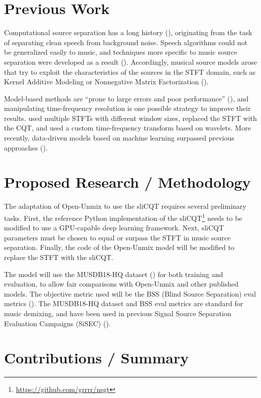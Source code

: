 \documentclass[letter,12pt]{article}
\begin{document}
\section{Previous Work}

Computational source separation has a long history (\cite{musicsepgood}), originating from the task of separating clean speech from background noise. Speech algorithms could not be generalized easily to music, and techniques more specific to music source separation were developed as a result (\cite{musicseptechniques1}). Accordingly, musical source models arose that try to exploit the characteristics of the sources in the STFT domain, such as Kernel Additive Modeling or Nonnegative Matrix Factorization (\cite{musicsepgood}).

Model-based methods are ``prone to large errors and poor performance'' (\cite[13]{musicsepintro1}), and manipulating time-frequency resolution is one possible strategy to improve their results. \textcite{driedger} used multiple STFTs with different window sizes, \textcite{fitzgerald2} replaced the STFT with the CQT, and \textcite{wavelets} used a custom time-frequency transform based on wavelets. More recently, data-driven models based on machine learning surpassed previous approaches (\cite{sisec2018, musicsepintro1}).

\section{Proposed Research / Methodology}

The adaptation of Open-Unmix to use the sliCQT requires several preliminary tasks. First, the reference Python implementation of the sliCQT\footnote{\url{https://github.com/grrrr/nsgt}} needs to be modified to use a GPU-capable deep learning framework. Next, sliCQT parameters must be chosen to equal or surpass the STFT in music source separation. Finally, the code of the Open-Unmix model will be modified to replace the STFT with the sliCQT.

The model will use the MUSDB18-HQ dataset (\cite{musdb18hq}) for both training and evaluation, to allow fair comparisons with Open-Unmix and other published models. The objective metric used will be the BSS (Blind Source Separation) eval metrics (\cite{bss}). The MUSDB18-HQ dataset and BSS eval metrics are standard for music demixing, and have been used in previous Signal Source Separation Evaluation Campaigns (SiSEC) (\cite{sisec2018}).

\section{Contributions / Summary}
\end{document}
